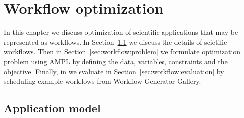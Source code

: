 { %


\newcommand{\INSTANCE}{I}
\newcommand{\STORAGE}{S}
\newcommand{\PROVIDER}{P}
\newcommand{\PROVIDERINSTANCES}{PI}
\newcommand{\LOCALSTORAGE}{LS}

\newcommand{\LAYER}{L}
\newcommand{\TASK}{G}


\newcommand{\instancePrice}{p^I}
\newcommand{\ccu}{ccu}
\newcommand{\instanceTransferPriceIn}{p^{Iin}}
\newcommand{\instanceTransferPriceOut}{p^{Iout}}
\newcommand{\storageTransferPriceOut}{p^{Sout}}
\newcommand{\storageTransferPriceIn}{p^{Sin}}
\newcommand{\transferRate}{r}


\newcommand{\taskCount}{A^{tot}}
\newcommand{\transferTime}{t^{net}}
\newcommand{\execTime}{t^x}
\newcommand{\dataSizeIn}{d^{in}}
\newcommand{\dataSizeOut}{d^{out}}
\newcommand{\requestPrice}{p^{R}}
\newcommand{\workflowDeadline}{t^D}
\newcommand{\instanceDeadline}{t^d}
\newcommand{\unitTime}{t^u}
\newcommand{\transferCost}{c^T}
\newcommand{\tasksPerDeadline}{a^d}
\newcommand{\timeQuantum}{t^q}
\newcommand{\tasksPerTimeQuantum}{a^q}
\newcommand{\providerMaxMachines}{n^{Pmax}}
\newcommand{\instanceMaxMachines}{n^{Imax}}

\newcommand{\NumberInstances}{N}
\newcommand{\TaskAssignment}{A}
\newcommand{\DataAssignment}{D}
\newcommand{\TailTaskHours}{R}
\newcommand{\HasTail}{H}

\newcommand{\instanceSet}{I^{idx}}
\newcommand{\InstanceTasks}{T}
\newcommand{\InstanceHours}{H}
\newcommand{\InstanceActive}{A}
\newcommand{\LayerDeadline}{D}
\newcommand{\LayerTime}{D^t}

\chapter{Workflow optimization}
\label{chap:formulation-workflows} 

    In this chapter we discuss optimization of scientific applications that may be represented as workflows. In Section \ref{sec:workflow:appmodel} we discuss the details of scietific workflows. Then in Section \ref{sec:workflow:problem} we formulate optimization problem using AMPL by defining the data, variables, constraints and the objective. Finally, in we evaluate in Section \ref{sec:workflow:evaluation} by scheduling example workflows from Workflow Generator Gallery.
  
    \section{Application model}
    \label{sec:workflow:appmodel}
    
}
